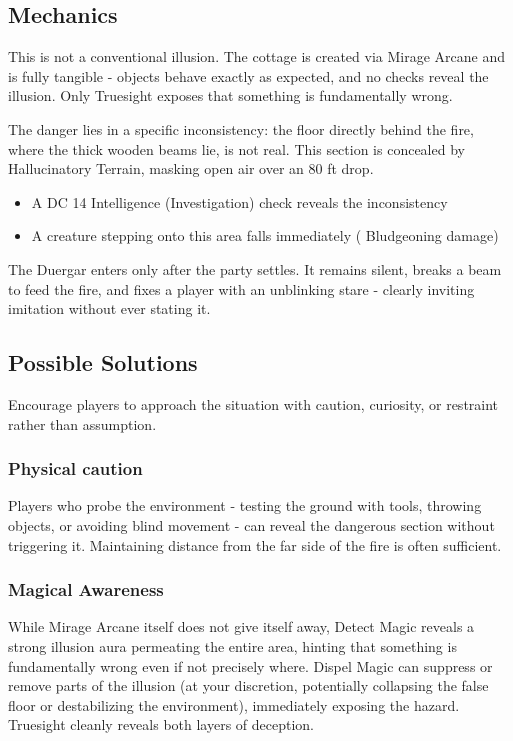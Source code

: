 \subsection*{Mechanics}
{\entryfont This is not a conventional illusion. The cottage is created via Mirage Arcane and is fully tangible - objects behave exactly as expected, and no checks reveal the illusion. Only Truesight exposes that something is fundamentally wrong.

The danger lies in a specific inconsistency: the floor directly behind the fire, where the thick wooden beams lie, is not real. This section is concealed by Hallucinatory Terrain, masking open air over an 80 ft drop.

\begin{itemize}
	\item A DC 14 Intelligence (Investigation) check reveals the inconsistency
	\item A creature stepping onto this area falls immediately ( Bludgeoning damage)
\end{itemize}

\noindent The Duergar enters only after the party settles. It remains silent, breaks a beam to feed the fire, and fixes a player with an unblinking stare - clearly inviting imitation without ever stating it.}

\subsection*{Possible Solutions}
{\entryfont Encourage players to approach the situation with caution, curiosity, or restraint rather than assumption.}
\subsubsection*{Physical caution}
{\entryfont Players who probe the environment - testing the ground with tools, throwing objects, or avoiding blind movement - can reveal the dangerous section without triggering it. Maintaining distance from the far side of the fire is often sufficient.}
\subsubsection*{Magical Awareness}
{\entryfont While Mirage Arcane itself does not give itself away, Detect Magic reveals a strong illusion aura permeating the entire area, hinting that something is fundamentally wrong even if not precisely where. Dispel Magic can suppress or remove parts of the illusion (at your discretion, potentially collapsing the false floor or destabilizing the environment), immediately exposing the hazard. Truesight cleanly reveals both layers of deception.}
